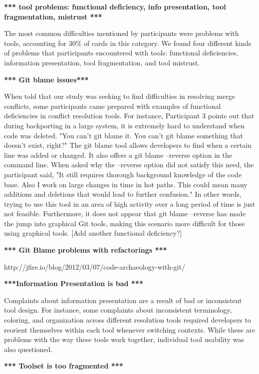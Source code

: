 \textbf{*** tool problems: functional deficiency, info presentation, tool fragmentation,  mistrust ***}

The most common difficulties mentioned by participants were problems with tools, accounting for 30\% of cards in this category. We found four different kinds of problems that participants encountered with tools: functional deficiencies, information presentation, tool fragmentation, and tool mistrust. 

\textbf{*** Git blame issues***}

When told that our study was seeking to find difficulties in resolving merge conflicts, some participants came prepared with examples of functional deficiencies in conflict resolution tools. For instance, Participant 3 points out that during backporting in a large system, it is extremely hard to understand when code was deleted. "You can't git blame it. You can't git blame something that doesn't exist, right?" 
The git blame tool allows developers to find when a certain line was added or changed. It also offers a git blame --reverse option in the command line. When asked why the --reverse option did not satisfy this need, the participant said, "It still requires thorough background knowledge of the code base. Also I work on large changes in time in hot paths. This could mean many additions and deletions that would lead to further confusion." In other words, trying to use this tool in an area of high activity over a long period of time is just not feasible. Furthermore, it does not appear that git blame --reverse has made the jump into graphical Git tools, making this scenario more difficult for those using graphical tools. [Add another functional deficiency?]

\textbf{*** Git Blame problems with refactorings ***}

http://jfire.io/blog/2012/03/07/code-archaeology-with-git/

\textbf{***Information Presentation is bad ***}

Complaints about information presentation are a result of bad or inconsistent tool design. For instance, some complaints about inconsistent terminology, coloring, and organization across different resolution tools required developers to reorient themselves within each tool whenever switching contexts. While these are problems with the way these tools work together, individual tool usability was also questioned.

\textbf{*** Toolset is too fragmented ***}

